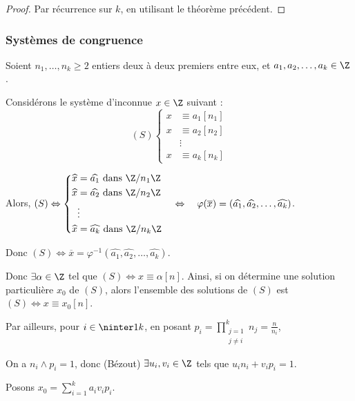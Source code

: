 \begin{proof}
    Par récurrence sur $k$, en utilisant le théorème précédent.
\end{proof}

\subsubsection{Systèmes de congruence}

Soient $n_1, \ldots, n_k \geqslant 2$ entiers deux à deux premiers entre eux, et 
$a_1, a_2, \ldots, a_k \in \Z$.

Considérons le système d'inconnue $x \in \Z$ suivant :
\[
    (S) \left\{ 
        \begin{aligned}
            x & \equiv a_1 [n_1] \\
            x & \equiv a_2 [n_2] \\
            & \vdots \\
            x & \equiv a_k [n_k]
        \end{aligned}
    \right.
\] 

Alors, $(S) \Leftrightarrow \left\{ 
    \begin{aligned}
        \widehat x & = \widehat{a_1} \text{ dans } \Z / n_1 \Z \\
        \widehat x & = \widehat{a_2} \text{ dans } \Z / n_2 \Z \\
        & \vdots \\
        \widehat x & = \widehat{a_k} \text{ dans } \Z / n_k \Z
    \end{aligned} \right. \quad \Leftrightarrow  \quad\varphi(\overline x) = (\widehat{a_1}, \widehat{a_2}, \ldots, \widehat{a_k})$.

Donc $(S) \Leftrightarrow \overline x = \varphi^{-1}(\widehat{a_1}, \widehat{a_2}, \ldots, \widehat{a_k})$.

Donc $\exists \alpha \in \Z$ tel que $(S) \Leftrightarrow x \equiv \alpha [n]$. Ainsi, si on détermine 
une solution particulière $x_0$ de $(S)$, alors l'ensemble des solutions de $(S)$ est 
$(S) \Leftrightarrow x \equiv x_0 [n]$.

Par ailleurs, pour $i \in \ninter 1 k$, en posant $\displaystyle p_i = \prod_{\substack{j = 1 \\ j \neq i}}^k n_j = \frac n {n_i}$,

On a $n_i \wedge p_i = 1$, donc (Bézout) $\exists u_i, v_i \in \Z$ tels que $u_i n_i + v_i p_i = 1$.

Posons $x_0 = \displaystyle \sum_{i = 1}^k a_i v_i p_i$.

